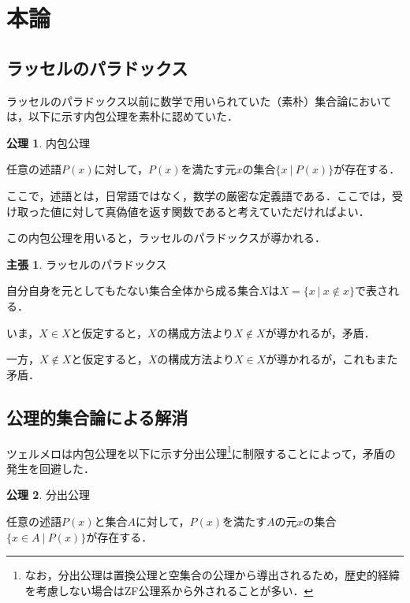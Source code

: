 \documentclass[10pt, a5paper, twoside]{jsarticle}
\theoremstyle{definition}
\newtheorem{clm}{主張}
\newtheorem{axm}{公理}
\begin{document}
	\section{本論}

		\subsection{ラッセルのパラドックス}

			ラッセルのパラドックス以前に数学で用いられていた（素朴）集合論においては，以下に示す内包公理を素朴に認めていた．

				\begin{axm}
					
					内包公理

					任意の述語$P(x)$に対して，$P(x)$を満たす元$x$の集合$ \{ x \ |\  P(x) \} $が存在する．

				\end{axm}

			ここで，述語とは，日常語ではなく，数学の厳密な定義語である．ここでは，受け取った値に対して真偽値を返す関数であると考えていただければよい．

			この内包公理を用いると，ラッセルのパラドックスが導かれる．

				\begin{clm}

					ラッセルのパラドックス

					自分自身を元としてもたない集合全体から成る集合$X$は$X = \{ x \ |\  x \notin x\} $で表される．

					いま，$X \in X$と仮定すると，$X$の構成方法より$X \notin X$が導かれるが，矛盾．

					一方，$X \notin X$と仮定すると，$X$の構成方法より$X \in X$が導かれるが，これもまた矛盾．
				
				\end{clm}

		\subsection{公理的集合論による解消}

			ツェルメロは内包公理を以下に示す分出公理\footnote{なお，分出公理は置換公理と空集合の公理から導出されるため，歴史的経緯を考慮しない場合はZF公理系から外されることが多い．}に制限することによって，矛盾の発生を回避した．

				\begin{axm}
					
					分出公理

					任意の述語$P(x)$と集合$A$に対して，$P(x)$を満たす$A$の元$x$の集合$ \{ x \in A \ |\  P(x) \} $が存在する．

				\end{axm}
\end{document}
